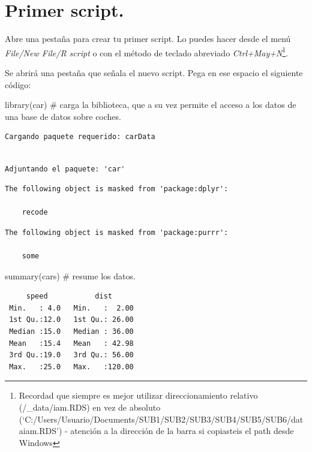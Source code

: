 \documentclass[
  letterpaper,
  DIV=11,
  numbers=noendperiod]{scrreprt}
\newenvironment{Shaded}{\begin{snugshade}}{\end{snugshade}}
\newcommand{\CommentTok}[1]{\textcolor[rgb]{0.37,0.37,0.37}{#1}}
\newcommand{\FunctionTok}[1]{\textcolor[rgb]{0.28,0.35,0.67}{#1}}
\newcommand{\NormalTok}[1]{\textcolor[rgb]{0.00,0.23,0.31}{#1}}
\begin{document}
\hypertarget{primer-script.}{%
\section{Primer script.}\label{primer-script.}}

Abre una pestaña para crear tu primer script. Lo puedes hacer desde el
menú \emph{File/New File/R script} o con el método de teclado abreviado
\emph{Ctrl+May+N}\footnote{Recordad que siempre es mejor utilizar
  direccionamiento relativo (/\_data/iam.RDS) en vez de absoluto
  (`C:/Users/Usuario/Documents/SUB1/SUB2/SUB3/SUB4/SUB5/SUB6/dataiam.RDS')
  - atención a la dirección de la barra si copiasteis el path desde
  Windows}.

Se abrirá una pestaña que señala el nuevo script. Pega en ese espacio el
siguiente código:

\begin{Shaded}
\begin{Highlighting}[]
\FunctionTok{library}\NormalTok{(car) }\CommentTok{\# carga la biblioteca, que a su vez permite el acceso a los datos de una base de datos sobre coches.}
\end{Highlighting}
\end{Shaded}

\begin{verbatim}
Cargando paquete requerido: carData
\end{verbatim}

\begin{verbatim}

Adjuntando el paquete: 'car'
\end{verbatim}

\begin{verbatim}
The following object is masked from 'package:dplyr':

    recode
\end{verbatim}

\begin{verbatim}
The following object is masked from 'package:purrr':

    some
\end{verbatim}

\begin{Shaded}
\begin{Highlighting}[]
\FunctionTok{summary}\NormalTok{(cars) }\CommentTok{\# resume los datos.}
\end{Highlighting}
\end{Shaded}

\begin{verbatim}
     speed           dist       
 Min.   : 4.0   Min.   :  2.00  
 1st Qu.:12.0   1st Qu.: 26.00  
 Median :15.0   Median : 36.00  
 Mean   :15.4   Mean   : 42.98  
 3rd Qu.:19.0   3rd Qu.: 56.00  
 Max.   :25.0   Max.   :120.00  
\end{verbatim}
\end{document}
